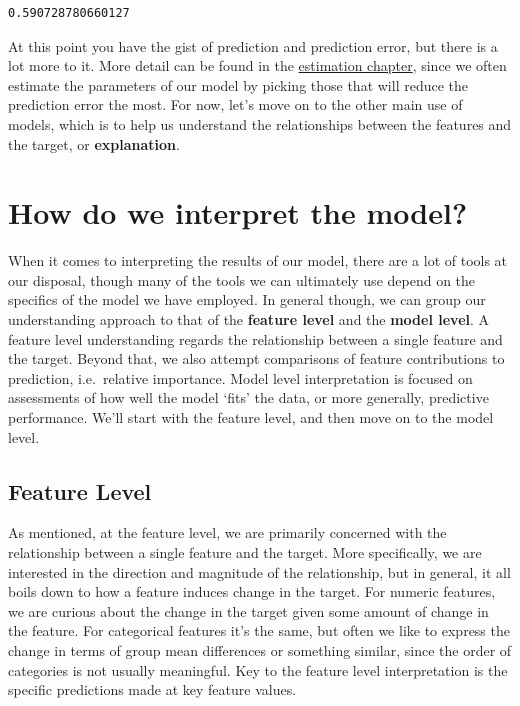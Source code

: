 \documentclass[
  letterpaper,
]{krantz}
\begin{document}
\begin{verbatim}
0.590728780660127
\end{verbatim}

At this point you have the gist of prediction and prediction error, but
there is a lot more to it. More detail can be found in the
\hyperref[estimation]{estimation chapter}, since we often estimate the
parameters of our model by picking those that will reduce the prediction
error the most. For now, let's move on to the other main use of models,
which is to help us understand the relationships between the features
and the target, or \textbf{explanation}.

\section{How do we interpret the
model?}\label{how-do-we-interpret-the-model}

When it comes to interpreting the results of our model, there are a lot
of tools at our disposal, though many of the tools we can ultimately use
depend on the specifics of the model we have employed. In general
though, we can group our understanding approach to that of the
\textbf{feature level} and the \textbf{model level}. A feature level
understanding regards the relationship between a single feature and the
target. Beyond that, we also attempt comparisons of feature
contributions to prediction, i.e.~relative importance. Model level
interpretation is focused on assessments of how well the model `fits'
the data, or more generally, predictive performance. We'll start with
the feature level, and then move on to the model level.

\subsection{Feature Level}\label{feature-level}

As mentioned, at the feature level, we are primarily concerned with the
relationship between a single feature and the target. More specifically,
we are interested in the direction and magnitude of the relationship,
but in general, it all boils down to how a feature induces change in the
target. For numeric features, we are curious about the change in the
target given some amount of change in the feature. For categorical
features it's the same, but often we like to express the change in terms
of group mean differences or something similar, since the order of
categories is not usually meaningful. Key to the feature level
interpretation is the specific predictions made at key feature values.
\end{document}
